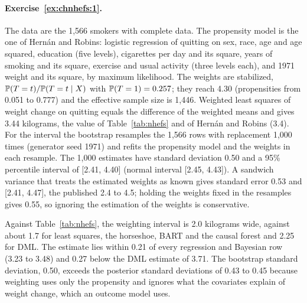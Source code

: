 \paragraph{Exercise~\ref{ex:chnhefs:1}.} The data are the 1,566 smokers with complete data. The propensity model is the one of Hern\'an and Robins: logistic regression of quitting on sex, race, age and age squared, education (five levels), cigarettes per day and its square, years of smoking and its square, exercise and usual activity (three levels each), and 1971 weight and its square, by maximum likelihood. The weights are stabilized, $\mathbb{P}(T = t)/\mathbb{P}(T = t \mid X)$ with $\mathbb{P}(T = 1) = 0.257$; they reach 4.30 (propensities from 0.051 to 0.777) and the effective sample size is 1,446. Weighted least squares of weight change on quitting equals the difference of the weighted means and gives 3.44 kilograms, the value of Table~\ref{tab:nhefs} and of Hern\'an and Robins (3.4). For the interval the bootstrap resamples the 1,566 rows with replacement 1,000 times (generator seed 1971) and refits the propensity model and the weights in each resample. The 1,000 estimates have standard deviation 0.50 and a 95\% percentile interval of [2.41, 4.40] (normal interval [2.45, 4.43]). A sandwich variance that treats the estimated weights as known gives standard error 0.53 and [2.41, 4.47], the published 2.4 to 4.5; holding the weights fixed in the resamples gives 0.55, so ignoring the estimation of the weights is conservative.

Against Table~\ref{tab:nhefs}, the weighting interval is 2.0 kilograms wide, against about 1.7 for least squares, the horseshoe, BART and the causal forest and 2.25 for DML. The estimate lies within 0.21 of every regression and Bayesian row (3.23 to 3.48) and 0.27 below the DML estimate of 3.71. The bootstrap standard deviation, 0.50, exceeds the posterior standard deviations of 0.43 to 0.45 because weighting uses only the propensity and ignores what the covariates explain of weight change, which an outcome model uses.

